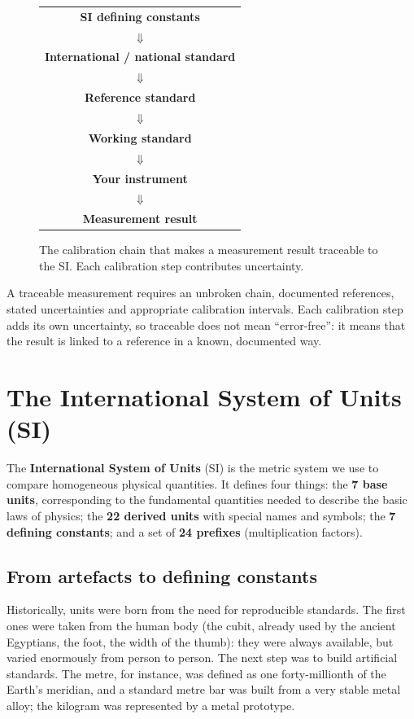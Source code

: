 \documentclass[letterpaper,11pt,leqno]{book}
\begin{document}
\begin{figure}[!htbp]
\centering
\begin{tabular}{c}
\toprule
\textbf{SI defining constants} \\
$\Downarrow$ \\
\textbf{International / national standard} \\
$\Downarrow$ \\
\textbf{Reference standard} \\
$\Downarrow$ \\
\textbf{Working standard} \\
$\Downarrow$ \\
\textbf{Your instrument} \\
$\Downarrow$ \\
\textbf{Measurement result} \\
\bottomrule
\end{tabular}
\caption{The calibration chain that makes a measurement result traceable to the SI. Each calibration step contributes uncertainty.}
\label{fig:traceability_pyramid}
\end{figure}

A traceable measurement requires an unbroken chain, documented references, stated uncertainties and appropriate calibration intervals. Each calibration step adds its own uncertainty, so traceable does not mean ``error-free'': it means that the result is linked to a reference in a known, documented way.

\section{The International System of Units (SI)}
\label{sec:si}

The \textbf{International System of Units} (SI) is the metric system we use to compare homogeneous physical quantities. It defines four things: the \textbf{7 base units}, corresponding to the fundamental quantities needed to describe the basic laws of physics; the \textbf{22 derived units} with special names and symbols; the \textbf{7 defining constants}; and a set of \textbf{24 prefixes} (multiplication factors).

\subsection{From artefacts to defining constants}

Historically, units were born from the need for reproducible standards. The first ones were taken from the human body (the cubit, already used by the ancient Egyptians, the foot, the width of the thumb): they were always available, but varied enormously from person to person. The next step was to build artificial standards. The metre, for instance, was defined as one forty-millionth of the Earth's meridian, and a standard metre bar was built from a very stable metal alloy; the kilogram was represented by a metal prototype.
\end{document}
